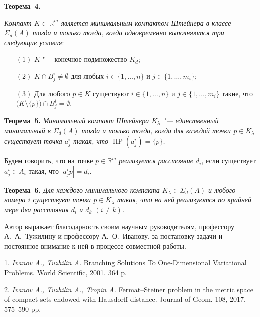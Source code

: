 \textbf{Теорема~4.} {\it Компакт $K \subset {\mathbb R^m}$ является минимальным компактом Штейнера в классе $\Sigma_d(A)$ тогда и только тогда, когда одновременно выполняются три следующие условия$:$
	\begin{itemize}
		\item[$(1)$] $K$ "--- конечное подмножество $K_d;$
		\item[$(2)$] $K\cap B_j^i\neq \emptyset$ для любых $i\in \{1,\ldots,n\}$ и $j\in \{1,\ldots,m_i\};$
		\item[$(3)$] Для любого $p \in K$ существуют $i\in \{1,\ldots,n\}$ и $j\in \{1,\ldots,m_i\}$ такие, что $\bigl(K\setminus \{p\}\bigr)\cap B_j^i=\emptyset$.
\end{itemize}}

\textbf{Теорема~5.} {\it Минимальный компакт Штейнера $K_\lambda$ "--- единственный минимальный в $\Sigma_d(A)$ тогда и только тогда, когда для каждой точки $p \in K_\lambda$ существует точка $a^i_j$ такая, что $\operatorname{HP}(a^i_j)=\{p\}$.}

Будем говорить, что на точке $p\in \mathbb R^m$ \emph{реализуется расстояние $d_i$}, если существует $a_j^i\in A_i$ такая, что $|a_j^ip|=d_i$.

\textbf{Теорема~6.} {\it Для каждого минимального компакта $K_\lambda \in \Sigma_d(A)$ и любого номера $i$ существует точка $p\in K_\lambda$ такая, что на ней реализуются по крайней мере два расстояния $d_i$ и $d_k$ $(i\neq k)$.}

Автор выражает благодарность своим научным руководителям, профессору А.~А.~Тужилину и профессору А.~О.~Иванову, за постановку задачи и постоянное внимание к ней в процессе совместной работы.



\litlist


1. {\it Ivanov A., Tuzhilin A.} Branching Solutions To One-Dimensional Variational Problems. World Scientific, 2001. 364 p.

2. {\it Ivanov A., Tuzhilin A., Tropin A.} Fermat–Steiner problem in the metric space of compact sets endowed with Hausdorff distance. Journal of Geom. 108, 2017. 575--590 pp.
